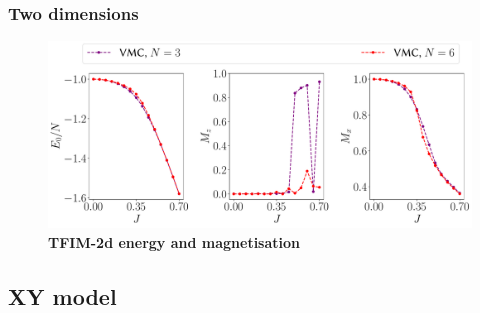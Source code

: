 \begin{figure}[H]
	\centering
	 \\
	\caption[]{\textbf{}}
	\label{fig:tfim1d_sisj}
\end{figure}

\subsubsection{Two dimensions}
\begin{figure}[H]
	\centering
	\includegraphics[width=\linewidth]{Chapter5/Figs/Vector/tfim2d_finite_scaling.pdf}
	\caption[TFIM-2d energy and magnetisations]{\textbf{TFIM-2d energy and magnetisation}}
	\label{fig:tfim2d_finite_scaling_properties}
\end{figure}

\newpage
\subsection{XY model}